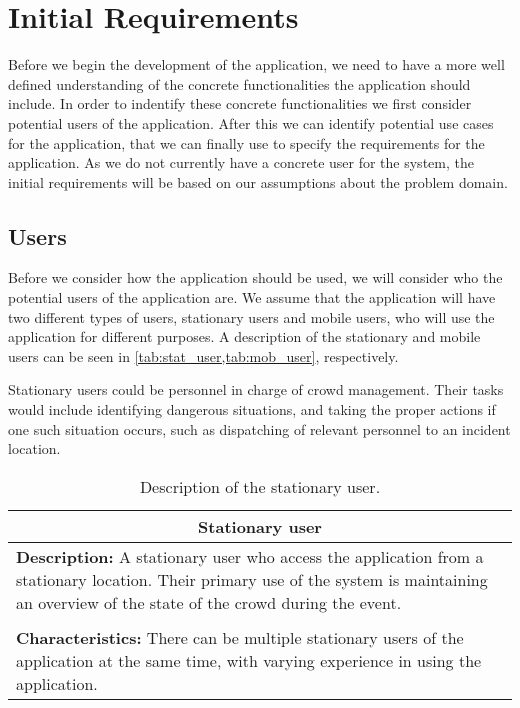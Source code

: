 \section{Initial Requirements}\label{sec:s1_requirements}
Before we begin the development of the application, we need to have a more well defined understanding of the concrete functionalities the application should include. In order to indentify these concrete functionalities we first consider potential users of the application. After this we can identify potential use cases for the application, that we can finally use to specify the requirements for the application. As we do not currently have a concrete user for the system, the initial requirements will be based on our assumptions about the problem domain. 

\subsection{Users}
Before we consider how the application should be used, we will consider who the potential users of the application are. We assume that the application will have two different types of users, stationary users and mobile users, who will use the application for different purposes. A description of the stationary and mobile users can be seen in \cref{tab:stat_user,tab:mob_user}, respectively.

Stationary users could be personnel in charge of crowd management. Their tasks would include identifying dangerous situations, and taking the proper actions if one such situation occurs, such as dispatching of relevant personnel to an incident location.

\begin{table}[h!]
    \centering
    \begin{tabularx}{/4}{X}
        \toprule
        \multicolumn{1}{c}{\textbf{Stationary user}} \\ 
        \midrule
        \textbf{Description:} A stationary user who access the application from a stationary location. Their primary use of the system is maintaining an overview of the state of the crowd during the event. \\
        \\
        \textbf{Characteristics:} There can be multiple stationary users of the application at the same time, with varying experience in using the application. \\
        \bottomrule
    \end{tabularx}
    \caption{Description of the stationary user.}
    \label{tab:stat_user}
\end{table}

